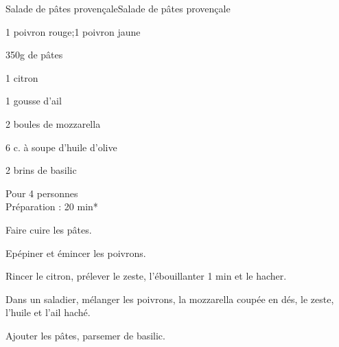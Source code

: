 \begin{recette}{Salade de p\^ates provençale}{Salade de p\^ates provençale}		%

\begin{ingredients}
1 poivron rouge;1 poivron jaune \par
350g de p\^ates \par
1 citron \par
1 gousse d'ail\par
2 boules de mozzarella \par
6 c. \`a soupe d'huile d'olive\par
2 brins de basilic
\end{ingredients}
\begin{infos}
Pour 4 personnes \\
Préparation : 20 min*
\end{infos}
\begin{etapes}
\item Faire cuire les p\^ates.
\item Ep\'epiner et \'emincer les poivrons.
\item Rincer le citron, pr\'elever le zeste, l'\'ebouillanter 1 min et le hacher.
\item Dans un saladier, m\'elanger les poivrons, la mozzarella coup\'ee en d\'es, le zeste, l'huile et l'ail hach\'e.
\item Ajouter les p\^ates, parsemer de basilic.
\end{etapes}
\end{recette}



